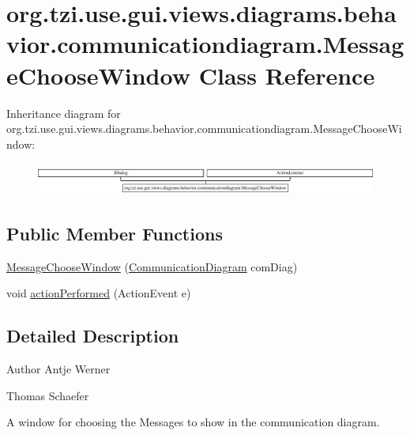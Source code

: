 \hypertarget{classorg_1_1tzi_1_1use_1_1gui_1_1views_1_1diagrams_1_1behavior_1_1communicationdiagram_1_1_message_choose_window}{\section{org.\-tzi.\-use.\-gui.\-views.\-diagrams.\-behavior.\-communicationdiagram.\-Message\-Choose\-Window Class Reference}
\label{classorg_1_1tzi_1_1use_1_1gui_1_1views_1_1diagrams_1_1behavior_1_1communicationdiagram_1_1_message_choose_window}
}
Inheritance diagram for org.\-tzi.\-use.\-gui.\-views.\-diagrams.\-behavior.\-communicationdiagram.\-Message\-Choose\-Window\-:\begin{figure}[H]
\begin{center}
\leavevmode
\includegraphics[height=1.078998cm]{classorg_1_1tzi_1_1use_1_1gui_1_1views_1_1diagrams_1_1behavior_1_1communicationdiagram_1_1_message_choose_window}
\end{center}
\end{figure}
\subsection*{Public Member Functions}
\begin{DoxyCompactItemize}
\item 
\hyperlink{classorg_1_1tzi_1_1use_1_1gui_1_1views_1_1diagrams_1_1behavior_1_1communicationdiagram_1_1_message_choose_window_ab4ed5f8bcc3829d33b3afa5a15054901}{Message\-Choose\-Window} (\hyperlink{classorg_1_1tzi_1_1use_1_1gui_1_1views_1_1diagrams_1_1behavior_1_1communicationdiagram_1_1_communication_diagram}{Communication\-Diagram} com\-Diag)
\item 
void \hyperlink{classorg_1_1tzi_1_1use_1_1gui_1_1views_1_1diagrams_1_1behavior_1_1communicationdiagram_1_1_message_choose_window_adeba5a5ae842a8b010bbe4fbfbeb532d}{action\-Performed} (Action\-Event e)
\end{DoxyCompactItemize}


\subsection{Detailed Description}
\begin{DoxyAuthor}{Author}
Antje Werner 

Thomas Schaefer \begin{DoxyVerb}    A window for choosing the Messages to show in the communication diagram.\end{DoxyVerb}
 
\end{DoxyAuthor}



